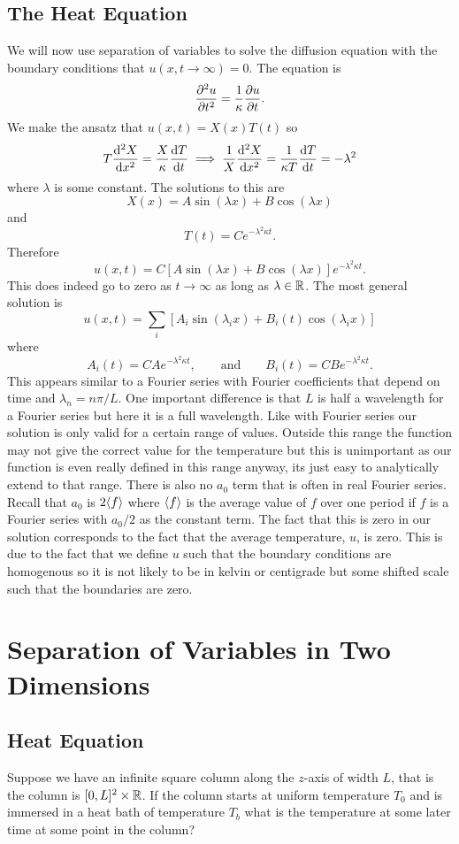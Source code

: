\documentclass[a4paper]{article}
\begin{document}
    \subsection{The Heat Equation}
    We will now use separation of variables to solve the diffusion equation with the boundary conditions that \(u(x, t\to\infty) = 0\).
    The equation is
    \[\pdv[2]{u}{t} = \frac{1}{\kappa}\pdv{u}{t}.\]
    We make the ansatz that \(u(x, t) = X(x)T(t)\) so
    \[T\dv[2]{X}{x} = \frac{X}{\kappa}\dv{T}{t} \implies \frac{1}{X}\dv[2]{X}{x} = \frac{1}{\kappa T}\dv{T}{t} = -\lambda^2\]
    where \(\lambda\) is some constant.
    The solutions to this are
    \[X(x) = A\sin(\lambda x) + B\cos(\lambda x)\]
    and
    \[T(t) = Ce^{-\lambda^2\kappa t}.\]
    Therefore
    \[u(x, t) = C[A\sin(\lambda x) + B\cos(\lambda x)]e^{-\lambda^2\kappa t}.\]
    This does indeed go to zero as \(t\to\infty\) as long as \(\lambda\in\mathbb{R}\).
    The most general solution is
    \[u(x, t) = \sum_i [A_i\sin(\lambda_i x) + B_i(t)\cos(\lambda_i x)]\]
    where
    \[A_i(t) = CAe^{-\lambda^2 \kappa t}, \qquad\text{and}\qquad B_i(t) = CBe^{-\lambda^2 \kappa t}.\]
    This appears similar to a Fourier series with Fourier coefficients that depend on time and \(\lambda_n = n\pi/L\).
    One important difference is that \(L\) is half a wavelength for a Fourier series but here it is a full wavelength.
    Like with Fourier series our solution is only valid for a certain range of values.
    Outside this range the function may not give the correct value for the temperature but this is unimportant as our function is even really defined in this range anyway, its just easy to analytically extend to that range.
    There is also no \(a_0\) term that is often in real Fourier series.
    Recall that \(a_0\) is \(2\langle{f}\rangle\) where \(\langle{f}\rangle\) is the average value of \(f\) over one period if \(f\) is a Fourier series with \(a_0/2\) as the constant term.
    The fact that this is zero in our solution corresponds to the fact that the average temperature, \(u\), is zero.
    This is due to the fact that we define \(u\) such that the boundary conditions are homogenous so it is not likely to be in kelvin or centigrade but some shifted scale such that the boundaries are zero.
    
    \section{Separation of Variables in Two Dimensions}
    \subsection{Heat Equation}
    Suppose we have an infinite square column along the \(z\)-axis of width \(L\), that is the column is \([0, L]^2\times\mathbb{R}\).
    If the column starts at uniform temperature \(T_0\) and is immersed in a heat bath of temperature \(T_b\) what is the temperature at some later time at some point in the column?
    
\end{document}
